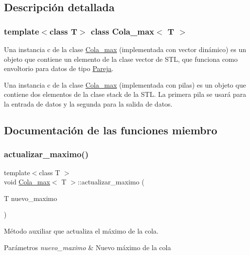 \subsection{Descripción detallada}
\subsubsection*{template$<$class T$>$\newline
class Cola\+\_\+max$<$ T $>$}

Una instancia c de la clase \hyperlink{classCola__max}{Cola\+\_\+max} (implementada con vector dinámico) es un objeto que contiene un elemento de la clase vector de S\+TL, que funciona como envoltorio para datos de tipo \hyperlink{structPareja}{Pareja}. 

Una instancia c de la clase \hyperlink{classCola__max}{Cola\+\_\+max} (implementada con pilas) es un objeto que contiene dos elementos de la clase stack de la S\+TL. La primera pila se usará para la entrada de datos y la segunda para la salida de datos. 

\subsection{Documentación de las funciones miembro}
\mbox{\label{classCola__max_a3da0159f810815fbbd7f3ba895f65e62}} 
\subsubsection{\texorpdfstring{actualizar\+\_\+maximo()}{actualizar\_maximo()}\hspace{0.1cm}{\footnotesize\ttfamily [1/2]}}
{\footnotesize\ttfamily template$<$class T $>$ \\
void \hyperlink{classCola__max}{Cola\+\_\+max}$<$ T $>$\+::actualizar\+\_\+maximo (\begin{DoxyParamCaption}\item[{T}]{nuevo\+\_\+maximo }\end{DoxyParamCaption})\hspace{0.3cm}{\ttfamily [private]}}



Método auxiliar que actualiza el máximo de la cola. 


\begin{DoxyParams}{Parámetros}
{\em nuevo\+\_\+maximo} & Nuevo máximo de la cola \\
\hline
\end{DoxyParams}
\mbox{\label{classCola__max_a3da0159f810815fbbd7f3ba895f65e62}} 
